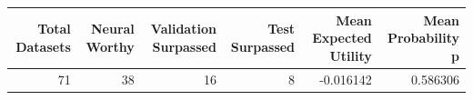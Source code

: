 \begin{tabular}{rrrrrr}
\toprule
Total Datasets & Neural Worthy & Validation Surpassed & Test Surpassed & Mean Expected Utility & Mean Probability p \\
\midrule
71 & 38 & 16 & 8 & -0.016142 & 0.586306 \\
\bottomrule
\end{tabular}
